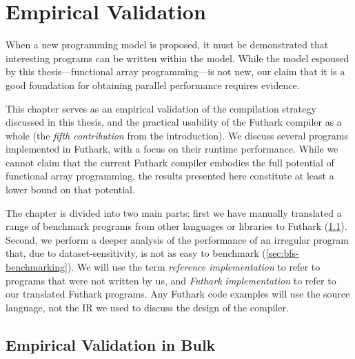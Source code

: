 \chapter{Empirical Validation}
\label{chap:empirical-validation}

When a new programming model is proposed, it must be demonstrated that
interesting programs can be written within the model.  While the model
espoused by this thesis---functional array programming---is not new,
our claim that it is a good foundation for obtaining parallel
performance requires evidence.

This chapter serves as an empirical validation of the compilation
strategy discussed in this thesis, and the practical usability of the
Futhark compiler as a whole (the \textit{fifth contribution} from the
introduction).  We discuss several programs implemented in Futhark,
with a focus on their runtime performance.  While we cannot claim that
the current Futhark compiler embodies the full potential of functional
array programming, the results presented here constitute at least a
lower bound on that potential.

The chapter is divided into two main parts: first we have manually
translated a range of benchmark programs from other languages or
libraries to Futhark (\cref{sec:bulk-benchmarking}).  Second, we
perform a deeper analysis of the performance of an irregular program
that, due to dataset-sensitivity, is not as easy to benchmark
(\cref{sec:bfs-benchmarking}).  We will use the term \textit{reference
  implementation} to refer to programs that were not written by us,
and \textit{Futhark implementation} to refer to our translated Futhark
programs.  Any Futhark code examples will use the source language, not
the IR we used to discuss the design of the compiler.

\section{Empirical Validation in Bulk}
\label{sec:bulk-benchmarking}

\newcommand\results[1]{ &  &  &  }

